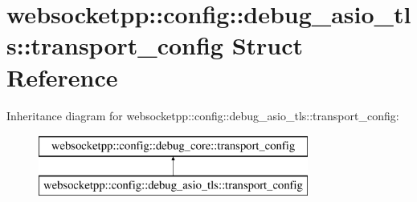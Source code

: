 \hypertarget{structwebsocketpp_1_1config_1_1debug__asio__tls_1_1transport__config}{}\section{websocketpp\+:\+:config\+:\+:debug\+\_\+asio\+\_\+tls\+:\+:transport\+\_\+config Struct Reference}
\label{structwebsocketpp_1_1config_1_1debug__asio__tls_1_1transport__config}
Inheritance diagram for websocketpp\+:\+:config\+:\+:debug\+\_\+asio\+\_\+tls\+:\+:transport\+\_\+config\+:\begin{figure}[H]
\begin{center}
\leavevmode
\includegraphics[height=2.000000cm]{structwebsocketpp_1_1config_1_1debug__asio__tls_1_1transport__config}
\end{center}
\end{figure}
